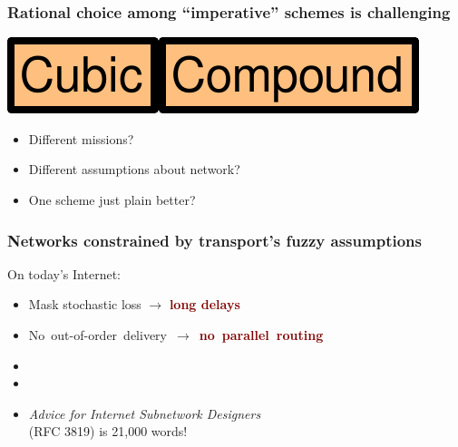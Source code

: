 \documentclass[svgnames]{beamer}
\newcommand{\ssline}{\vspace{8 pt}}
\begin{document}
\begin{frame}
\frametitle{Rational choice among ``imperative'' schemes is challenging}

\begin{centering}
\includegraphics[height=20 pt]{cubic.pdf}\hspace{8 pt}{\bf vs.}\hspace{8 pt}\includegraphics[height=20 pt]{compound.pdf}

\end{centering}

\ssline
\ssline
\ssline

\begin{itemize}

\Large

\item Different missions?

\item Different assumptions about network?

\item One scheme just plain better?

\end{itemize}

\end{frame}

\begin{frame}
\frametitle{Networks constrained by transport's fuzzy assumptions}

\Large

On today's Internet:

\begin{itemize}
\item Mask stochastic loss $\rightarrow$ {\bf \textcolor{Maroon}{long delays}}
\item \mbox{No out-of-order delivery $\rightarrow$ {\bf \textcolor{Maroon}{no parallel routing}}}
\item[]
\item[]
\item[] {\it Advice for Internet Subnetwork Designers}\\ (RFC 3819) is 21,000 words!
\end{itemize}

\end{frame}
\end{document}
